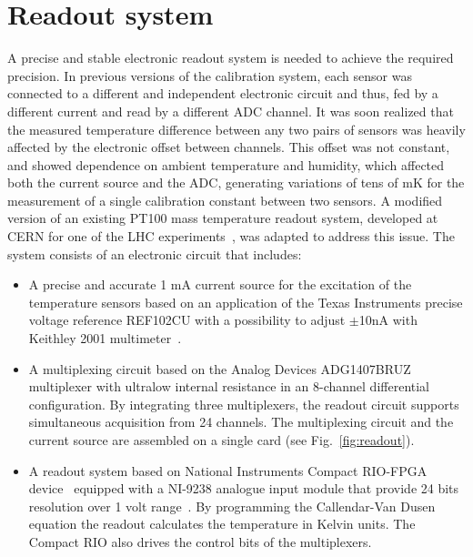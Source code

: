 \section{Readout system}
\label{sec:readout}
\noindent A precise and stable electronic readout system is needed to achieve the required precision. In previous versions of the calibration system, each sensor was connected to a different and independent electronic circuit and thus, fed by a different current and read by a different ADC channel. It was soon realized that the measured temperature difference between any two pairs of sensors was heavily affected by the electronic offset between channels. This offset was not constant, and showed dependence on ambient temperature and humidity, which affected both the current source and the ADC, generating variations of tens of mK for the measurement of a single calibration constant between two sensors. A modified version of an existing PT100 mass temperature readout system, developed at CERN for one of the LHC experiments~\cite{bib:multiplexing_board}, was adapted to address this issue. The system consists of an electronic circuit that includes:

\begin{itemize}
\item A precise and accurate 1 mA current source for the excitation of the temperature sensors based on an application of the Texas Instruments precise voltage reference REF102CU with a possibility to adjust $\pm$10nA with Keithley 2001 multimeter~\cite{xavier,keithley}.%
\item A multiplexing circuit based on the Analog Devices ADG1407BRUZ multiplexer with ultralow internal resistance in an 8-channel differential configuration. By integrating three multiplexers, the readout circuit supports simultaneous acquisition from 24 channels. The multiplexing circuit and the current source are assembled on a single card (see Fig.~\ref{fig:readout}).
\item A readout system based on National Instruments Compact RIO-FPGA device~\cite{compactrio} equipped with a NI-9238 analogue input module that provide 24 bits resolution over 1 volt range~\cite{ni9238}. By programming the Callendar-Van Dusen equation the readout calculates the temperature in Kelvin units. The Compact RIO also drives the control bits of the multiplexers.
\end{itemize}

